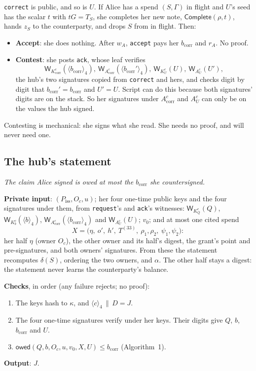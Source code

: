 \documentclass[11pt]{article}
\theoremstyle{plain}
\theoremstyle{definition}
\newcommand{\bcorr}{b_{\mathrm{corr}}}
\newcommand{\tx}[1]{\texttt{#1}}
\newcommand{\be}[2]{\langle #1\rangle_{#2}}
\newcommand{\Compl}{\mathsf{Complete}}
\newcommand{\Wots}{\mathsf{W}}
\newcommand{\Piss}{P_{\mathrm{iss}}}
\newcommand{\owed}{\mathsf{owed}}
\newcommand{\Oc}{O_c}
\newcommand{\KQ}{K_{Q}^{c}}
\newcommand{\Kb}{K_{b}^{c}}
\newcommand{\Kcorr}{K_{\mathrm{corr}}^{c}}
\newcommand{\KU}{K_{U}^{c}}
\newcommand{\Acorr}{A_{\mathrm{corr}}^{c}}
\newcommand{\AU}{A_{U}^{c}}
\begin{document}
\tx{correct} is public, and so is $U$. If Alice has a spend $(S,
\Gamma)$ in flight and $U$'s seed has the scalar $t$ with $tG = T_S$,
she completes her new note, $\Compl(\rho, t)$, hands $z_S$ to the
counterparty, and drops $S$ from in flight. Then:
\begin{itemize}[nosep]
\item \textbf{Accept}: she does nothing. After $w_A$, \tx{accept} pays
  her $\bcorr$ and $r_A$. No proof.
\item \textbf{Contest}: she posts \tx{ack}, whose leaf verifies
  \[
    \Wots_{\Kcorr}(\be{\bcorr}{4}),\ \Wots_{\Acorr}(\be{\bcorr'}{4}),\
    \Wots_{\KU}(U),\ \Wots_{\AU}(U'),
  \]
  the hub's two signatures copied from \tx{correct} and hers, and checks
  digit by digit that $\bcorr' = \bcorr$ and $U' = U$. Script can do
  this because both signatures' digits are on the stack. So her
  signatures under $\Acorr$ and $\AU$ can only be on the values the hub
  signed.
\end{itemize}
Contesting is mechanical: she signs what she read. She needs no proof,
and will never need one.

\subsection{The hub's statement}\label{sec:statement}

\emph{The claim Alice signed is owed at most the $\bcorr$ she
countersigned.}

\textbf{Private input}: $(\Piss, \Oc, u)$; her four one-time public
keys and the four signatures under them, from \tx{request}'s and
\tx{ack}'s witnesses: $\Wots_{\KQ}(Q)$, $\Wots_{\Kb}(\be{b}{4})$,
$\Wots_{\Acorr}(\be{\bcorr}{4})$ and $\Wots_{\AU}(U)$; $v_0$; and at
most one cited spend
\[
  X = \big(\eta,\ o',\ h',\ T^{(33)},\ \rho_1, \rho_2,\ \psi_1, \psi_2\big):
\]
her half $\eta$ (owner $\Oc$), the other owner and its half's digest,
the grant's point and pre-signatures, and both owners' signatures. From
these the statement recomputes $\delta(S)$, ordering the two owners, and
$\alpha$. The other half stays a digest: the statement never learns the
counterparty's balance.

\textbf{Checks}, in order (any failure rejects; no proof):
\begin{enumerate}[nosep]
\item The keys hash to $\kappa$, and $\be{c}{4} \,\|\, D = J$.
\item The four one-time signatures verify under her keys. Their digits
  give $Q$, $b$, $\bcorr$ and $U$.
\item $\owed(Q, b, \Oc, u, v_0, X, U) \le \bcorr$ (Algorithm~1).
\end{enumerate}
\textbf{Output}: $J$.
\end{document}
